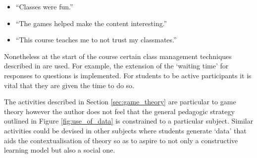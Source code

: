\documentclass[12pt, a4paper]{article}
\begin{document}
\begin{itemize}
    \item ``Classes were fun.''
    \item ``The games helped make the content interesting.''
    \item ``This course teaches me to not trust my classmates.''
\end{itemize}

Nonetheless at the start of the course certain class management techniques
described in \cite{Rocca2010} are used. For example, the extension of the
`waiting time' for responses to questions is implemented. For students to be
active participants it is vital that they are given the time to do so.


The activities described in Section \ref{sec:game_theory} are particular to game
theory however the author does not feel that the general pedagogic strategy
outlined in Figure \ref{fig:use_of_data} is constrained to a particular subject.
Similar activities could be devised in other subjects where students generate
`data' that aids the contextualisation of theory so as to aspire to not only a
constructive learning model but also a social one.

\printbibliography
\end{document}
